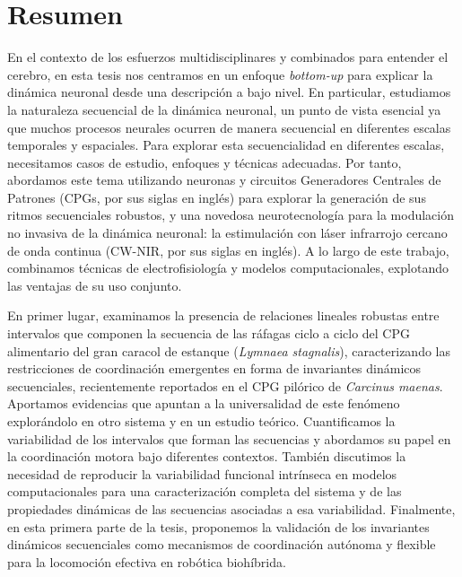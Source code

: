 \chapter*{Resumen}
En el contexto de los esfuerzos multidisciplinares y combinados para entender el cerebro, en esta tesis nos centramos en un enfoque \textit{bottom-up} para explicar la dinámica neuronal desde una descripción a bajo nivel. En particular, estudiamos la naturaleza secuencial de la dinámica neuronal, un punto de vista esencial ya que muchos procesos neurales ocurren de manera secuencial en diferentes escalas temporales y espaciales. Para explorar esta secuencialidad en diferentes escalas, necesitamos casos de estudio, enfoques y técnicas adecuadas. Por tanto, abordamos este tema utilizando neuronas y circuitos Generadores Centrales de Patrones (CPGs, por sus siglas en inglés) para explorar la generación de sus ritmos secuenciales robustos, y una novedosa neurotecnología para la modulación no invasiva de la dinámica neuronal: la estimulación con láser infrarrojo cercano de onda continua (CW-NIR, por sus siglas en inglés). A lo largo de este trabajo, combinamos técnicas de electrofisiología y modelos computacionales, explotando las ventajas de su uso conjunto.

En primer lugar, examinamos la presencia de relaciones lineales robustas entre intervalos que componen la secuencia de las ráfagas ciclo a ciclo del CPG alimentario del gran caracol de estanque (\textit{Lymnaea stagnalis}), caracterizando las restricciones de coordinación emergentes en forma de invariantes dinámicos secuenciales, recientemente reportados en el CPG pilórico de \textit{Carcinus maenas}. Aportamos evidencias que apuntan a la universalidad de este fenómeno explorándolo en otro sistema y en un estudio teórico. Cuantificamos la variabilidad de los intervalos que forman las secuencias y abordamos su papel en la coordinación motora bajo diferentes contextos. También discutimos la necesidad de reproducir la variabilidad funcional intrínseca en modelos computacionales para una caracterización completa del sistema y de las propiedades dinámicas de las secuencias asociadas a esa variabilidad. Finalmente, en esta primera parte de la tesis, proponemos la validación de los invariantes dinámicos secuenciales como mecanismos de coordinación autónoma y flexible para la locomoción efectiva en robótica biohíbrida.

